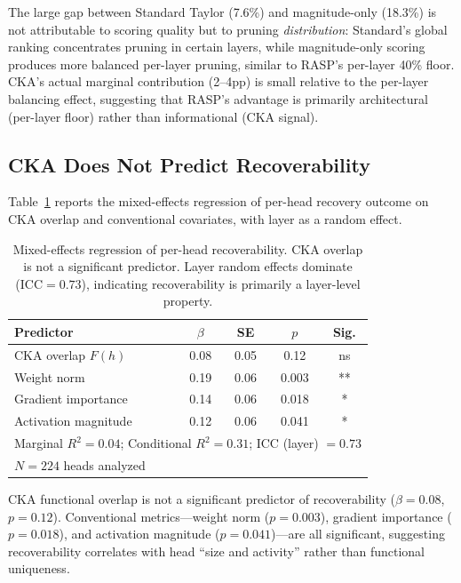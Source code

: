 \documentclass[11pt,a4paper]{article}
\begin{document}
The large gap between Standard Taylor (7.6\%) and magnitude-only (18.3\%) is not attributable to scoring quality but to pruning \emph{distribution}: Standard's global ranking concentrates pruning in certain layers, while magnitude-only scoring produces more balanced per-layer pruning, similar to RASP's per-layer 40\% floor.
CKA's actual marginal contribution (2--4pp) is small relative to the per-layer balancing effect, suggesting that RASP's advantage is primarily architectural (per-layer floor) rather than informational (CKA signal).

\subsection{CKA Does Not Predict Recoverability}
\label{sec:cka_results}

Table~\ref{tab:regression} reports the mixed-effects regression of per-head recovery outcome on CKA overlap and conventional covariates, with layer as a random effect.

\begin{table}[t]
\centering
\small
\begin{tabular}{lcccc}
\toprule
\textbf{Predictor} & \textbf{$\beta$} & \textbf{SE} & \textbf{$p$} & \textbf{Sig.} \\
\midrule
CKA overlap $F(h)$ & 0.08 & 0.05 & 0.12 & ns \\
Weight norm & 0.19 & 0.06 & 0.003 & ** \\
Gradient importance & 0.14 & 0.06 & 0.018 & * \\
Activation magnitude & 0.12 & 0.06 & 0.041 & * \\
\midrule
\multicolumn{5}{l}{Marginal $R^2 = 0.04$; Conditional $R^2 = 0.31$; ICC (layer) $= 0.73$} \\
\multicolumn{5}{l}{$N = 224$ heads analyzed} \\
\bottomrule
\end{tabular}
\caption{Mixed-effects regression of per-head recoverability. CKA overlap is not a significant predictor. Layer random effects dominate (ICC$=0.73$), indicating recoverability is primarily a layer-level property.}
\label{tab:regression}
\end{table}

CKA functional overlap is not a significant predictor of recoverability ($\beta = 0.08$, $p = 0.12$).
Conventional metrics---weight norm ($p = 0.003$), gradient importance ($p = 0.018$), and activation magnitude ($p = 0.041$)---are all significant, suggesting recoverability correlates with head ``size and activity'' rather than functional uniqueness.
\end{document}
